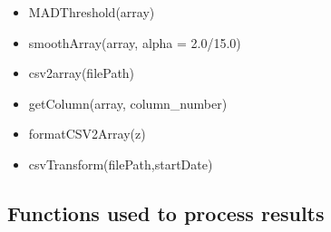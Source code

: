 \begin{itemize}
\begin{itemize}
	\end{itemize}
 
 
 \item MADThreshold(array) \\
 \item smoothArray(array, alpha = 2.0/15.0) \\
 \item csv2array(filePath) \\
 \item getColumn(array, column\_number) \\
 \item formatCSV2Array(z) \\

 \item csvTransform(filePath,startDate) \\

\end{itemize}


\subsection{Functions used to process results}

